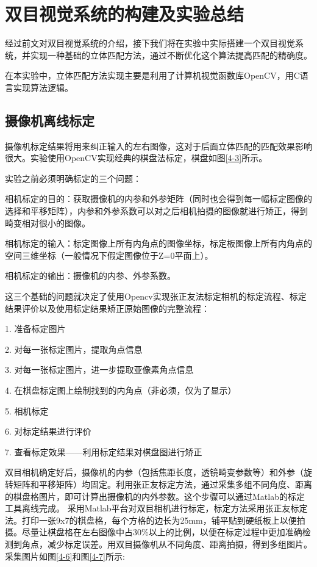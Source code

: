
\chapter{双目视觉系统的构建及实验总结}
经过前文对双目视觉系统的介绍，接下我们将在实验中实际搭建一个双目视觉系统，并实现一种基础的立体匹配方法，通过不断优化这个算法提高匹配的精确度。

在本实验中，立体匹配方法实现主要是利用了计算机视觉函数库OpenCV，用C语言实现算法逻辑。

\section{摄像机离线标定}
摄像机标定结果将用来纠正输入的左右图像，这对于后面立体匹配的匹配效果影响很大。实验使用OpenCV实现经典的棋盘法标定，棋盘如图\ref{4-3}所示。

实验之前必须明确标定的三个问题：

相机标定的目的：获取摄像机的内参和外参矩阵（同时也会得到每一幅标定图像的选择和平移矩阵），内参和外参系数可以对之后相机拍摄的图像就进行矫正，得到畸变相对很小的图像。

相机标定的输入：标定图像上所有内角点的图像坐标，标定板图像上所有内角点的空间三维坐标（一般情况下假定图像位于Z=0平面上）。

相机标定的输出：摄像机的内参、外参系数。

这三个基础的问题就决定了使用Opencv实现张正友法标定相机的标定流程、标定结果评价以及使用标定结果矫正原始图像的完整流程：

1. 准备标定图片

2. 对每一张标定图片，提取角点信息

3. 对每一张标定图片，进一步提取亚像素角点信息

4. 在棋盘标定图上绘制找到的内角点（非必须，仅为了显示）

5. 相机标定

6. 对标定结果进行评价

7. 查看标定效果——利用标定结果对棋盘图进行矫正

双目相机确定好后，摄像机的内参（包括焦距长度，透镜畸变参数等）和外参（旋转矩阵和平移矩阵）均固定。利用张正友标定方法，通过采集多组不同角度、距离的棋盘格图片，即可计算出摄像机的内外参数。这个步骤可以通过Matlab的标定工具离线完成。
采用Matlab平台对双目相机进行标定，标定方法采用张正友标定法。打印一张9x7的棋盘格，每个方格的边长为25mm，铺平贴到硬纸板上以便拍摄。尽量让棋盘格在左右图像中占30\%以上的比例，以便在标定过程中更加准确检测到角点，减少标定误差。用双目摄像机从不同角度、距离拍摄，得到多组图片。采集图片如图\ref{4-6}和图\ref{4-7}所示:

